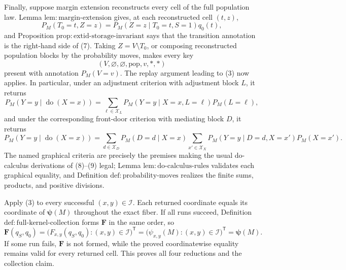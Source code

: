 Finally, suppose margin extension reconstructs every cell of the full population law. Lemma \(\mathrm{lem{:}margin\text{-}extension}\) gives, at each reconstructed cell \((t,z)\),
\[
 P_M(T_0=t,Z=z)
 =P_M(Z=z\mid T_0=t,S=1)q_0(t),
 \tag{7}
\]
and Proposition \(\mathrm{prop{:}extid\text{-}storage\text{-}invariant}\) says that the transition annotation is the right-hand side of (7). Taking \(Z=V\setminus T_0\), or composing reconstructed population blocks by the probability moves, makes every key
\[
 (V,\varnothing,\varnothing,\mathrm{pop},v,\ast,\ast)
\]
present with annotation \(P_M(V=v)\). The replay argument leading to (3) now applies. In particular, under an adjustment criterion with adjustment block \(L\), it returns
\[
 P_M(Y=y\mid\operatorname{do}(X=x))
 =\sum_{\ell\in\mathcal X_L}
 P_M(Y=y\mid X=x,L=\ell)P_M(L=\ell),
 \tag{8}
\]
and under the corresponding front-door criterion with mediating block \(D\), it returns
\[
 P_M(Y=y\mid\operatorname{do}(X=x))
 =\sum_{d\in\mathcal X_D}P_M(D=d\mid X=x)
 \sum_{x'\in\mathcal X_X}
 P_M(Y=y\mid D=d,X=x')P_M(X=x').
 \tag{9}
\]
The named graphical criteria are precisely the premises making the usual do-calculus derivations of (8)--(9) legal; Lemma \(\mathrm{lem{:}do\text{-}calculus\text{-}rules}\) validates each graphical equality, and Definition \(\mathrm{def{:}probability\text{-}moves}\) realizes the finite sums, products, and positive divisions.

Apply (3) to every successful \((x,y)\in\mathcal I\). Each returned coordinate equals its coordinate of \(\boldsymbol\psi(M)\) throughout the exact fiber. If all runs succeed, Definition \(\mathrm{def{:}full\text{-}kernel\text{-}collection}\) forms \(\mathbf F\) in the same order, so
\[
 \mathbf F(q_S,q_0)
 =\bigl(F_{x,y}(q_S,q_0):(x,y)\in\mathcal I\bigr)^{\mathsf T}
 =\bigl(\psi_{x,y}(M):(x,y)\in\mathcal I\bigr)^{\mathsf T}
 =\boldsymbol\psi(M).
\]
If some run fails, \(\mathbf F\) is not formed, while the proved coordinatewise equality remains valid for every returned cell. This proves all four reductions and the collection claim.